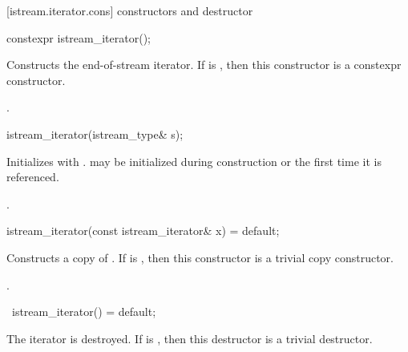 [istream.iterator.cons]{ constructors and destructor}


%
\begin{itemdecl}
constexpr istream_iterator();
\end{itemdecl}

\begin{itemdescr}
\pnum
\effects
Constructs the end-of-stream iterator.
If  is ,
then this constructor is a constexpr constructor.

\pnum
\postconditions {}.
\end{itemdescr}


%
\begin{itemdecl}
istream_iterator(istream_type& s);
\end{itemdecl}

\begin{itemdescr}
\pnum
\effects
Initializes  with .
 may be initialized during
construction or the first time it is referenced.

\pnum
\postconditions {}.
\end{itemdescr}


%
\begin{itemdecl}
istream_iterator(const istream_iterator& x) = default;
\end{itemdecl}

\begin{itemdescr}
\pnum
\effects
Constructs a copy of .
If  is ,
then this constructor is a trivial copy constructor.

\pnum
\postconditions {}.
\end{itemdescr}

%
\begin{itemdecl}
~istream_iterator() = default;
\end{itemdecl}

\begin{itemdescr}
\pnum
\effects
The iterator is destroyed.
If  is ,
then this destructor is a trivial destructor.
\end{itemdescr}

